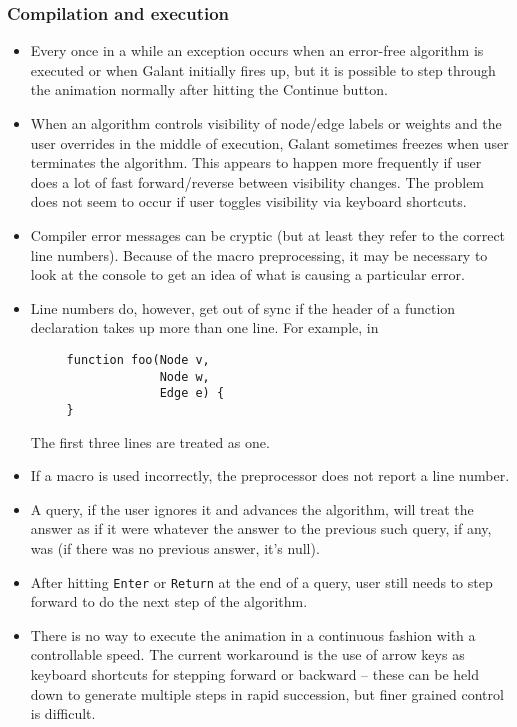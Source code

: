 \subsubsection*{Compilation and execution}

\begin{itemize}

\item Every once in a while an exception occurs when an error-free algorithm
  is executed or when Galant initially fires up, but it is possible to step
  through the animation normally after hitting the \textsf{Continue} button.

\item When an algorithm controls visibility of node/edge labels or weights
  and the user overrides in the middle of execution, Galant sometimes freezes
  when user terminates the algorithm. This appears to happen more frequently
  if user does a lot of fast forward/reverse between visibility changes. The
  problem does not seem to occur if user toggles visibility via keyboard shortcuts.

\item
  Compiler error messages can be cryptic (but at least they refer to the correct
  line numbers). Because of the macro preprocessing,
  it may be necessary to look at the console
  to get an idea of what is causing a particular error.

\item Line numbers do, however, get out of sync if the header of a function
  declaration takes up more than one line. For example, in
\begin{verbatim}
     function foo(Node v,
                  Node w,
                  Edge e) {
     }
\end{verbatim}
The first three lines are treated as one.

\item
  If a macro is used incorrectly,
  the preprocessor does not report a line number.

\item A query, if the user ignores it and advances the algorithm, will treat
  the answer as if it were whatever the answer to the previous such query, if
  any, was (if there was no previous answer, it's null).

\item After hitting \texttt{Enter} or \texttt{Return} at the end of a query,
  user still needs to step forward to do the next step of the algorithm.

\item
  There is no way to execute the animation in a continuous fashion with a
  controllable speed.
  The current workaround is the use of arrow keys as keyboard
  shortcuts for stepping forward or backward -- these can be held down to
  generate multiple steps in rapid succession, but finer grained control is
  difficult.

\end{itemize}


